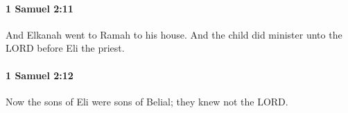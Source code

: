 		\paragraph{1 Samuel 2:11} %
			\label{1SAMUEL-2-11}

			And Elkanah went to Ramah to his house. And the child did minister unto the LORD before Eli the priest.


		\paragraph{1 Samuel 2:12} %
			\label{1SAMUEL-2-12}

			Now the sons of Eli were sons of Belial; they knew not the LORD.


